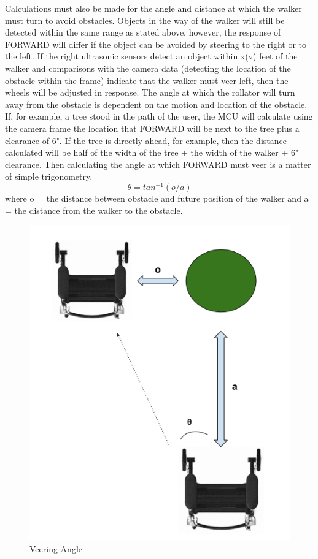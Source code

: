 \noindent Calculations must also be made for the angle and distance at which the walker must turn to avoid obstacles. Objects in the way of the walker will still be detected within the same range as stated above, however, the response of FORWARD will differ if the object can be avoided by steering to the right or to the left. If the right ultrasonic sensors detect an object within x(v) feet of the walker and comparisons with the camera data (detecting the location of the obstacle within the frame) indicate that the walker must veer left, then the wheels will be adjusted in response. The angle at which the rollator will turn away from the obstacle is dependent on the motion and location of the obstacle. If, for example, a tree stood in the path of the user, the MCU will calculate using the camera frame the location that FORWARD will be next to the tree plus a clearance of 6". If the tree is directly ahead, for example, then the distance calculated will be half of the width of the tree + the width of the walker + 6" clearance. Then calculating the angle at which FORWARD must veer is a matter of simple trigonometry.
\[ \theta = tan^{-1}(o/a)\]
\noindent where o = the distance between obstacle and future position of the walker and a = the distance from the walker to the obstacle.

\begin{figure}[H]
	\centering
	\includegraphics[width=.5\textwidth]{./Images/margin.png}
	\caption{\label{fig:margin}Veering Angle}
\end{figure}

